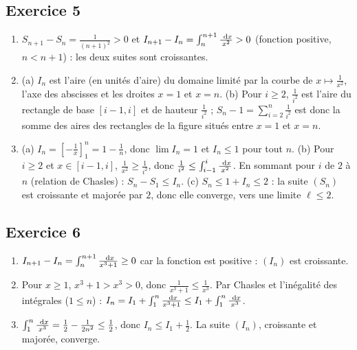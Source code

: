 \begin{corrige}
\subsection*{Exercice 5}
\begin{enumerate}
\item $S_{n+1} - S_n = \frac{1}{(n+1)^2} > 0$ et $I_{n+1} - I_n = \int_n^{n+1}\frac{~\mathrm{d}x}{x^2} > 0$ (fonction positive, $n < n+1$) :
      les deux suites sont croissantes.
\item (a) $I_n$ est l'aire (en unit\'es d'aire) du domaine limit\'e par la courbe de $x\mapsto\frac{1}{x^2}$, l'axe des abscisses
      et les droites $x = 1$ et $x = n$.
      (b) Pour $i \geq 2$, $\frac{1}{i^2}$ est l'aire du rectangle de base $[i-1,i]$ et de hauteur $\frac{1}{i^2}$ ;
      $S_n - 1 = \sum_{i=2}^n\frac{1}{i^2}$ est donc la somme des aires des rectangles de la figure situ\'es entre $x = 1$ et $x = n$.
\item (a) $I_n = \left[-\frac{1}{x}\right]_1^n = 1 - \frac{1}{n}$, donc $\lim I_n = 1$ et $I_n \leq 1$ pour tout $n$.
      (b) Pour $i\geq 2$ et $x\in[i-1,i]$, $\frac{1}{x^2}\geq\frac{1}{i^2}$, donc $\frac{1}{i^2}\leq\int_{i-1}^i\frac{~\mathrm{d}x}{x^2}$.
      En sommant pour $i$ de $2$ \`a $n$ (relation de Chasles) : $S_n - S_1 \leq I_n$.
      (c) $S_n \leq 1 + I_n \leq 2$ : la suite $(S_n)$ est croissante et major\'ee par $2$, donc elle converge, vers une limite $\ell\leq 2$.
\end{enumerate}

\subsection*{Exercice 6}
\begin{enumerate}
\item $I_{n+1} - I_n = \int_n^{n+1}\frac{~\mathrm{d}x}{x^3+1} \geq 0$ car la fonction est positive : $(I_n)$ est croissante.
\item Pour $x\geq 1$, $x^3 + 1 > x^3 > 0$, donc $\frac{1}{x^3+1} \leq \frac{1}{x^3}$.
      Par Chasles et l'in\'egalit\'e des int\'egrales ($1\leq n$) :
      $I_n = I_1 + \int_1^n\frac{~\mathrm{d}x}{x^3+1}\leq I_1 + \int_1^n\frac{~\mathrm{d}x}{x^3}$.
\item $\int_1^n\frac{~\mathrm{d}x}{x^3} = \frac{1}{2} - \frac{1}{2n^2}\leq\frac{1}{2}$, donc $I_n\leq I_1 + \frac{1}{2}$.
      La suite $(I_n)$, croissante et major\'ee, converge.
\end{enumerate}


\end{corrige}
